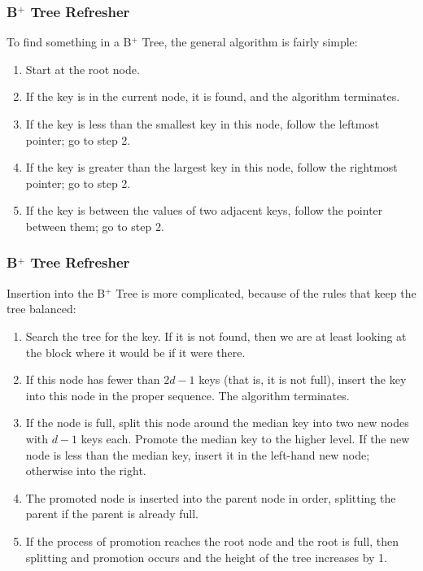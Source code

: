 \begin{frame}
\frametitle{B$^{+}$ Tree Refresher}


To find something in a B$^{+}$ Tree, the general algorithm is fairly simple:

\begin{enumerate}
	\item Start at the root node. 
	\item If the key is in the current node, it is found, and the algorithm terminates.
	\item If the key is less than the smallest key in this node, follow the leftmost pointer; go to step 2.
	\item If the key is greater than the largest key in this node, follow the rightmost pointer; go to step 2.
	\item If the key is between the values of two adjacent keys, follow the pointer between them; go to step 2.
\end{enumerate}


\end{frame}

\begin{frame}
\frametitle{B$^{+}$ Tree Refresher}

Insertion into the B$^{+}$ Tree is more complicated, because of the rules that keep the tree balanced:

\begin{enumerate}
	\item Search the tree for the key. If it is not found, then we are at least looking at the block where it would be if it were there.
	\item If this node has fewer than $2d-1$ keys (that is, it is not full), insert the key into this node in the proper sequence. The algorithm terminates.
	\item If the node is full, split this node around the median key into two new nodes with $d-1$ keys each. Promote the median key to the higher level. If the new node is less than the median key, insert it in the left-hand new node; otherwise into the right.
	\item The promoted node is inserted into the parent node in order, splitting the parent if the parent is already full.
	\item If the process of promotion reaches the root node and the root is full, then splitting and promotion occurs and the height of the tree increases by 1.
\end{enumerate}



\end{frame}

